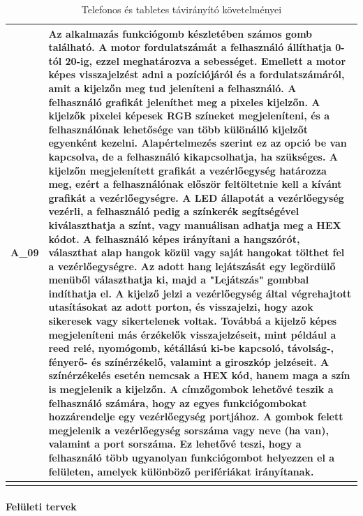\documentclass{article}
\begin{document}
\begin{longtable}{|c|p{14cm}|}
       \textbf{A\_09}  & Az alkalmazás funkciógomb készletében számos gomb található. A motor fordulatszámát a felhasználó állíthatja 0-tól 20-ig, ezzel meghatározva a sebességet. Emellett a motor képes visszajelzést adni a pozíciójáról és a fordulatszámáról, amit a kijelzőn meg tud jeleníteni a felhasználó. A felhasználó grafikát jeleníthet meg a pixeles kijelzőn. A kijelzők pixelei képesek RGB színeket megjeleníteni, és a felhasználónak lehetősége van több különálló kijelzőt egyenként kezelni. Alapértelmezés szerint ez az opció be van kapcsolva, de a felhasználó kikapcsolhatja, ha szükséges. A kijelzőn megjelenített grafikát a vezérlőegység határozza meg, ezért a felhasználónak először feltöltetnie kell a kívánt grafikát a vezérlőegységre. A LED állapotát a vezérlőegység vezérli, a felhasználó pedig a színkerék segítségével kiválaszthatja a színt, vagy manuálisan adhatja meg a HEX kódot. A felhasználó képes irányítani a hangszórót, választhat alap hangok közül vagy saját hangokat tölthet fel a vezérlőegységre. Az adott hang lejátszását egy legördülő menüből választhatja ki, majd a "Lejátszás" gombbal indíthatja el. A kijelző jelzi a vezérlőegység által végrehajtott utasításokat az adott porton, és visszajelzi, hogy azok sikeresek vagy sikertelenek voltak. Továbbá a kijelző képes megjeleníteni más érzékelők visszajelzéseit, mint például a reed relé, nyomógomb, kétállású ki-be kapcsoló, távolság-, fényerő- és színérzékelő, valamint a giroszkóp jelzéseit. A színérzékelés esetén nemcsak a HEX kód, hanem maga a szín is megjelenik a kijelzőn. A címzőgombok lehetővé teszik a felhasználó számára, hogy az egyes funkciógombokat hozzárendelje egy vezérlőegység portjához. A gombok felett megjelenik a vezérlőegység sorszáma vagy neve (ha van), valamint a port sorszáma. Ez lehetővé teszi, hogy a felhasználó több ugyanolyan funkciógombot helyezzen el a felületen, amelyek különböző perifériákat irányítanak. \\\hline
       
\hline
\caption{Telefonos és tabletes távirányító követelményei}
\end{longtable}
\endgroup

\paragraph{Felületi tervek}
\end{document}
